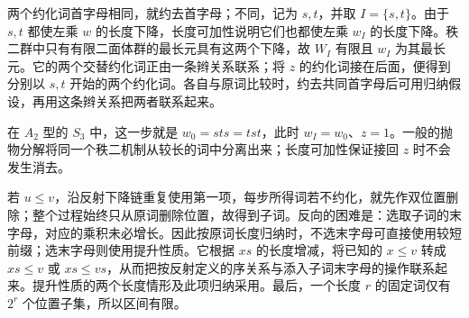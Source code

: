 \begin{proofsketch}
	两个约化词首字母相同，就约去首字母；不同，记为 \(s,t\)，并取 \(I=\{s,t\}\)。由于 \(s,t\) 都使左乘 \(w\) 的长度下降，长度可加性说明它们也都使左乘 \(w_I\) 的长度下降。秩二群中只有有限二面体群的最长元具有这两个下降，故 \(W_I\) 有限且 \(w_I\) 为其最长元。它的两个交替约化词正由一条辫关系联系；将 \(z\) 的约化词接在后面，便得到分别以 \(s,t\) 开始的两个约化词。各自与原词比较时，约去共同首字母后可用归纳假设，再用这条辫关系把两者联系起来。

	在 \(A_2\) 型的 \(S_3\) 中，这一步就是 \(w_0=sts=tst\)，此时 \(w_I=w_0\)、\(z=1\)。一般的抛物分解将同一个秩二机制从较长的词中分离出来；长度可加性保证接回 \(z\) 时不会发生消去。

	若 \(u\le v\)，沿反射下降链重复使用第一项，每步所得词若不约化，就先作双位置删除；整个过程始终只从原词删除位置，故得到子词。反向的困难是：选取子词的末字母，对应的乘积未必增长。因此按原词长度归纳时，不选末字母可直接使用较短前缀；选末字母则使用提升性质。它根据 \(xs\) 的长度增减，将已知的 \(x\le v\) 转成 \(xs\le v\) 或 \(xs\le vs\)，从而把按反射定义的序关系与添入子词末字母的操作联系起来。提升性质的两个长度情形及此项归纳采用\cite[Sections 5.8--5.10, pp. 117--120]{Humphreys1990ReflectionGroups}。最后，一个长度 \(r\) 的固定词仅有 \(2^r\) 个位置子集，所以区间有限。
\end{proofsketch}
